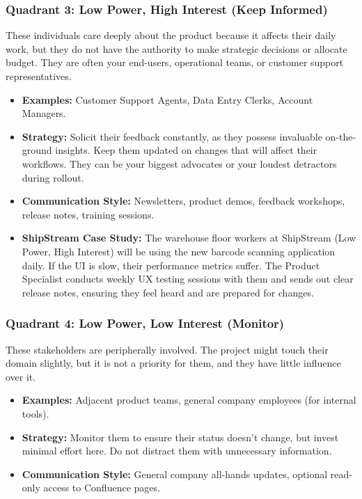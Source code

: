 \subsubsection{Quadrant 3: Low Power, High Interest (Keep
Informed)}\label{quadrant-3-low-power-high-interest-keep-informed}

These individuals care deeply about the product because it affects their
daily work, but they do not have the authority to make strategic
decisions or allocate budget. They are often your end-users, operational
teams, or customer support representatives.

\begin{itemize}
\tightlist
\item
  \textbf{Examples:} Customer Support Agents, Data Entry Clerks, Account
  Managers.
\item
  \textbf{Strategy:} Solicit their feedback constantly, as they possess
  invaluable on-the-ground insights. Keep them updated on changes that
  will affect their workflows. They can be your biggest advocates or
  your loudest detractors during rollout.
\item
  \textbf{Communication Style:} Newsletters, product demos, feedback
  workshops, release notes, training sessions.
\item
  \textbf{ShipStream Case Study:} The warehouse floor workers at
  ShipStream (Low Power, High Interest) will be using the new barcode
  scanning application daily. If the UI is slow, their performance
  metrics suffer. The Product Specialist conducts weekly UX testing
  sessions with them and sends out clear release notes, ensuring they
  feel heard and are prepared for changes.
\end{itemize}

\subsubsection{Quadrant 4: Low Power, Low Interest
(Monitor)}\label{quadrant-4-low-power-low-interest-monitor}

These stakeholders are peripherally involved. The project might touch
their domain slightly, but it is not a priority for them, and they have
little influence over it.

\begin{itemize}
\tightlist
\item
  \textbf{Examples:} Adjacent product teams, general company employees
  (for internal tools).
\item
  \textbf{Strategy:} Monitor them to ensure their status doesn't change,
  but invest minimal effort here. Do not distract them with unnecessary
  information.
\item
  \textbf{Communication Style:} General company all-hands updates,
  optional read-only access to Confluence pages.
\end{itemize}

